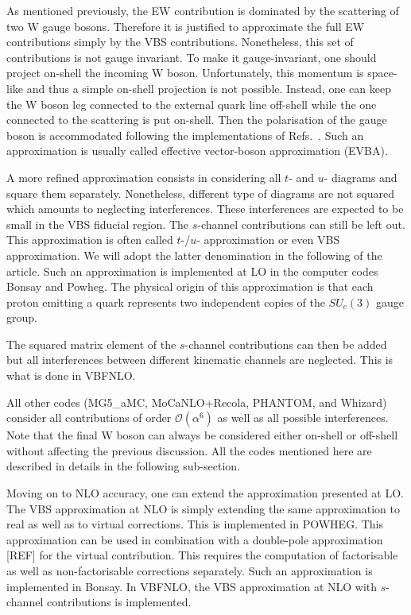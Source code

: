 As mentioned previously, the EW contribution is dominated by the scattering of two W gauge bosons.
Therefore it is justified to approximate the full EW contributions simply by the VBS contributions.
Nonetheless, this set of contributions is not gauge invariant.
To make it gauge-invariant, one should project on-shell the incoming W boson.
Unfortunately, this momentum is space-like and thus a simple on-shell projection is not possible.
Instead, one can keep the W boson leg connected to the external quark line off-shell while the one connected to the scattering is put on-shell.
Then the polarisation of the gauge boson is accommodated following the implementations of Refs.~\cite{Kuss:1995yv,Accomando:2006hq}.
Such an approximation is usually called effective vector-boson approximation (EVBA).

A more refined approximation consists in considering all $t$- and $u$- diagrams and square them separately.
Nonetheless, different type of diagrams are not squared which amounts to neglecting interferences.
These interferences are expected to be small in the VBS fiducial region.
The $s$-channel contributions can still be left out.
This approximation is often called $t$-/$u$- approximation or even VBS approximation.
We will adopt the latter denomination in the following of the article.
Such an approximation is implemented at LO in the computer codes {\sc Bonsay} and {\sc Powheg}.
The physical origin of this approximation is that each proton emitting a quark represents two independent copies of the $SU_c\left(3\right)$ gauge group.

The squared matrix element of the $s$-channel contributions can then be added but all interferences between different kinematic channels are neglected.
This is what is done in {\sc VBFNLO}.

All other codes ({\sc MG5\_aMC}, {\sc MoCaNLO+Recola}, {\sc PHANTOM}, and {\sc Whizard}) consider all contributions of order $\mathcal{O}{\left(\alpha^{6}\right)}$ as well as all possible interferences.
Note that the final W boson can always be considered either on-shell or off-shell without affecting the previous discussion.
All the codes mentioned here are described in details in the following sub-section.

Moving on to NLO accuracy, one can extend the approximation presented at LO.
The VBS approximation at NLO is simply extending the same approximation to real as well as to virtual corrections.
This is implemented in {\sc POWHEG}.
This approximation can be used in combination with a double-pole approximation [REF] for the virtual contribution.
This requires the computation of factorisable as well as non-factorisable corrections \cite{Dittmaier:2015bfe} separately.
Such an approximation is implemented in {\sc Bonsay}.
In {\sc VBFNLO}, the VBS approximation at NLO with $s$-channel contributions is implemented.

